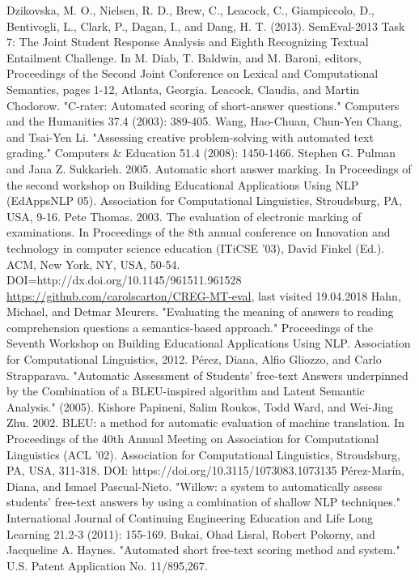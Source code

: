 \documentclass[rnd]{mas_report}
\begin{document}
\begin{thebibliography}{3}
 Dzikovska, M. O., Nielsen, R. D., Brew, C., Leacock, C., Giampiccolo, D., Bentivogli, L., Clark, P., Dagan, I., and Dang, H. T. (2013). SemEval-2013 Task 7: The Joint Student Response Analysis and Eighth Recognizing Textual Entailment Challenge. In M. Diab, T. Baldwin, and M. Baroni, editors, Proceedings of the Second Joint Conference on Lexical and Computational Semantics, pages 1-12, Atlanta, Georgia.
  Leacock, Claudia, and Martin Chodorow. "C-rater: Automated scoring of short-answer questions." Computers and the Humanities 37.4 (2003): 389-405.
 Wang, Hao-Chuan, Chun-Yen Chang, and Tsai-Yen Li. "Assessing creative problem-solving with automated text grading." Computers \& Education 51.4 (2008): 1450-1466.
 Stephen G. Pulman and Jana Z. Sukkarieh. 2005. Automatic short answer marking. In Proceedings of the second workshop on Building Educational Applications Using NLP (EdAppsNLP 05). Association for Computational Linguistics, Stroudsburg, PA, USA, 9-16.
 Pete Thomas. 2003. The evaluation of electronic marking of examinations. In Proceedings of the 8th annual conference on Innovation and technology in computer science education (ITiCSE '03), David Finkel (Ed.). ACM, New York, NY, USA, 50-54. DOI=http://dx.doi.org/10.1145/961511.961528
 \url{https://github.com/carolscarton/CREG-MT-eval}, last visited 19.04.2018
 Hahn, Michael, and Detmar Meurers. "Evaluating the meaning of answers to reading comprehension questions a semantics-based approach." Proceedings of the Seventh Workshop on Building Educational Applications Using NLP. Association for Computational Linguistics, 2012.
 Pérez, Diana, Alfio Gliozzo, and Carlo Strapparava. "Automatic Assessment of Students’ free-text Answers underpinned by the Combination of a BLEU-inspired algorithm and Latent Semantic Analysis." (2005).
 Kishore Papineni, Salim Roukos, Todd Ward, and Wei-Jing Zhu. 2002. BLEU: a method for automatic evaluation of machine translation. In Proceedings of the 40th Annual Meeting on Association for Computational Linguistics (ACL '02). Association for Computational Linguistics, Stroudsburg, PA, USA, 311-318. DOI: https://doi.org/10.3115/1073083.1073135
 Pérez-Marín, Diana, and Ismael Pascual-Nieto. "Willow: a system to automatically assess students’ free-text answers by using a combination of shallow NLP techniques." International Journal of Continuing Engineering Education and Life Long Learning 21.2-3 (2011): 155-169.
 Bukai, Ohad Lisral, Robert Pokorny, and Jacqueline A. Haynes. "Automated short free-text scoring method and system." U.S. Patent Application No. 11/895,267.

\end{thebibliography}
\end{document}
